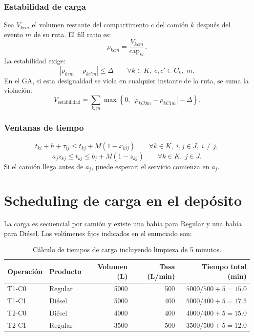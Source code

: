 \documentclass[11pt,letterpaper]{article}
\begin{document}
\subsubsection*{Estabilidad de carga}
Sea \(V_{kcm}\) el volumen restante del compartimento \(c\) del camión \(k\) después del
evento \(m\) de su ruta. El fill ratio es:
\[
    \rho_{kcm}=\frac{V_{kcm}}{\mathrm{cap}_{kc}}.
\]
La estabilidad exige:
\[
    |\rho_{kc m}-\rho_{kc' m}|\le \Delta
    \qquad
    \forall k\in K,\; c,c'\in C_k,\;m.
\]
En el GA, si esta desigualdad se viola en cualquier instante de la ruta, se suma la violación:
\[
    V_{\text{estabilidad}}=
    \sum_{k,m}\max\left\{0,\;|\rho_{kC0m}-\rho_{kC1m}|-\Delta\right\}.
\]

\subsubsection*{Ventanas de tiempo}
\[
    t_{ki}+h+\tau_{ij}
    \le t_{kj}+M(1-x_{kij})
    \qquad \forall k\in K,\;i,j\in J,\;i\neq j,
\]
\[
    a_jz_{kj}\le t_{kj}\le b_j+M(1-z_{kj})
    \qquad \forall k\in K,\;j\in J.
\]
Si el camión llega antes de \(a_j\), puede esperar; el servicio comienza en \(a_j\).

\section{Scheduling de carga en el depósito}

La carga es secuencial por camión y existe una bahía para Regular y una bahía para Diésel.
Los volúmenes fijos indicados en el enunciado son:

\begin{table}[h]
\centering
\begin{tabular}{llrrr}
\toprule
\textbf{Operación} & \textbf{Producto} & \textbf{Volumen (L)} & \textbf{Tasa (L/min)} & \textbf{Tiempo total (min)} \\
\midrule
T1-C0 & Regular & 5000 & 500 & \(5000/500+5=15.0\) \\
T1-C1 & Diésel & 5000 & 400 & \(5000/400+5=17.5\) \\
T2-C0 & Diésel & 4000 & 400 & \(4000/400+5=15.0\) \\
T2-C1 & Regular & 3500 & 500 & \(3500/500+5=12.0\) \\
\bottomrule
\end{tabular}
\caption{Cálculo de tiempos de carga incluyendo limpieza de 5 minutos.}
\end{table}
\end{document}
